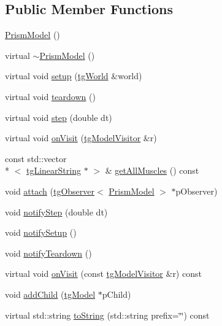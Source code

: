 \subsection*{Public Member Functions}
\begin{DoxyCompactItemize}
\item 
\hyperlink{class_prism_model_a65cad965224b87af83b1d40a77acb513}{Prism\-Model} ()
\item 
virtual \hyperlink{class_prism_model_aa59e518e573daae85a86e250faf1f164}{$\sim$\-Prism\-Model} ()
\item 
virtual void \hyperlink{class_prism_model_a29ef3abc8f1d0767744000661c1c02f1}{setup} (\hyperlink{classtg_world}{tg\-World} \&world)
\item 
virtual void \hyperlink{class_prism_model_ac2b643c26c4e27a27714ea07f274654a}{teardown} ()
\item 
virtual void \hyperlink{class_prism_model_af56267cc470ba060c634f869ab04d2d5}{step} (double dt)
\item 
virtual void \hyperlink{class_prism_model_aaa4a3eb8d8b8e79376a61735f5373bad}{on\-Visit} (\hyperlink{classtg_model_visitor}{tg\-Model\-Visitor} \&r)
\item 
const std\-::vector\\*
$<$ \hyperlink{classtg_linear_string}{tg\-Linear\-String} $\ast$ $>$ \& \hyperlink{class_prism_model_aa065620b101da7bbc581126d5325dea9}{get\-All\-Muscles} () const 
\item 
void \hyperlink{classtg_subject_a56ecfd33a048c3a7f1a884318d9af548}{attach} (\hyperlink{classtg_observer}{tg\-Observer}$<$ \hyperlink{class_prism_model}{Prism\-Model} $>$ $\ast$p\-Observer)
\item 
void \hyperlink{classtg_subject_ad9640aa7fcc1e0b4ce8a913a4ce1ea42}{notify\-Step} (double dt)
\item 
void \hyperlink{classtg_subject_a80799e5d0c8512d3d05a55764790392b}{notify\-Setup} ()
\item 
void \hyperlink{classtg_subject_adf7a60dbb0faf0de5528f862e7953e63}{notify\-Teardown} ()
\item 
virtual void \hyperlink{classtg_model_aee6457e0fc54d5570b87bfc779f9b1c0}{on\-Visit} (const \hyperlink{classtg_model_visitor}{tg\-Model\-Visitor} \&r) const 
\item 
void \hyperlink{classtg_model_a292c17848b96caee32b2286e44c13f2f}{add\-Child} (\hyperlink{classtg_model}{tg\-Model} $\ast$p\-Child)
\item 
virtual std\-::string \hyperlink{classtg_model_af37b0c1a6d4060bfe0bb9b5038a17725}{to\-String} (std\-::string prefix=\char`\"{}\char`\"{}) const 

\end{DoxyCompactItemize}
